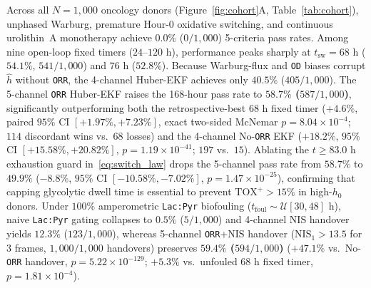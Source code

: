 \documentclass[11pt]{article}
\theoremstyle{plain}
\theoremstyle{remark}
\begin{document}
Across all $N = 1{,}000$ oncology donors (Figure~\ref{fig:cohort}A, Table~\ref{tab:cohort}), unphased Warburg, premature Hour-0 oxidative switching, and continuous urolithin~A monotherapy achieve $0.0\%$ ($0/1{,}000$) 5-criteria pass rates. Among nine open-loop fixed timers ($24\text{--}120\text{ h}$), performance peaks sharply at $t_{\mathrm{sw}} = 68\text{ h}$ ($54.1\%$, $541/1{,}000$) and $76\text{ h}$ ($52.8\%$). Because Warburg-flux and \texttt{OD} biases corrupt $\hat{h}$ without \texttt{ORR}, the 4-channel Huber-EKF achieves only $40.5\%$ ($405/1{,}000$). The 5-channel \texttt{ORR} Huber-EKF raises the 168-hour pass rate to \textbf{$58.7\%$ ($587/1{,}000$)}, significantly outperforming both the retrospective-best $68\text{ h}$ fixed timer ($+4.6\%$, paired $95\%$ CI $[+1.97\%, +7.23\%]$, exact two-sided McNemar $p = 8.04 \times 10^{-4}$; $114$ discordant wins vs.\ $68$ losses) and the 4-channel No-\texttt{ORR} EKF ($+18.2\%$, $95\%$ CI $[+15.58\%, +20.82\%]$, $p = 1.19 \times 10^{-41}$; $197$ vs.\ $15$). Ablating the $t \ge 83.0\text{ h}$ exhaustion guard in~\eqref{eq:switch_law} drops the 5-channel pass rate from $58.7\%$ to $49.9\%$ ($-8.8\%$, $95\%$ CI $[-10.58\%, -7.02\%]$, $p = 1.47 \times 10^{-25}$), confirming that capping glycolytic dwell time is essential to prevent $\mathrm{TOX}^+ > 15\%$ in high-$h_0$ donors. Under $100\%$ amperometric \texttt{Lac:Pyr} biofouling ($t_{\mathrm{foul}} \sim \mathcal{U}[30, 48]\text{ h}$), naive \texttt{Lac:Pyr} gating collapses to $0.5\%$ ($5/1{,}000$) and 4-channel $\mathrm{NIS}$ handover yields $12.3\%$ ($123/1{,}000$), whereas 5-channel \texttt{ORR}+$\mathrm{NIS}$ handover ($\mathrm{NIS}_1 > 13.5$ for $3$ frames, $1{,}000/1{,}000$ handovers) preserves \textbf{$59.4\%$ ($594/1{,}000$)} ($+47.1\%$ vs.\ No-\texttt{ORR} handover, $p = 5.22 \times 10^{-129}$; $+5.3\%$ vs.\ unfouled $68\text{ h}$ fixed timer, $p = 1.81 \times 10^{-4}$).
\end{document}
